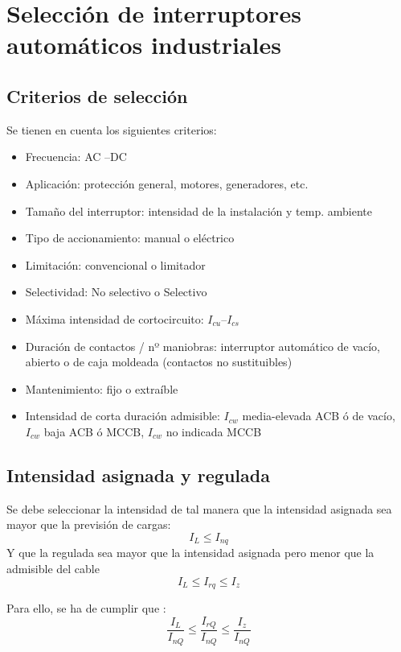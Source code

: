 \section{Selección de interruptores automáticos industriales}
\subsection{Criterios de selección}
Se tienen en cuenta los siguientes criterios:
\begin{itemize}
	\item Frecuencia: AC –DC
	\item Aplicación: protección general, motores, generadores, etc.
	\item Tamaño del interruptor: intensidad de la instalación y temp. ambiente
	\item Tipo de accionamiento: manual o eléctrico
	\item Limitación: convencional o limitador
	\item Selectividad: No selectivo o Selectivo
	\item Máxima intensidad de cortocircuito: $I_{cu}–I_{cs}$
	\item Duración de contactos / nº maniobras: interruptor automático de vacío, abierto o de caja moldeada (contactos no sustituibles)
	\item Mantenimiento: fijo o extraíble
	\item Intensidad de corta duración admisible: $I_{cw}$ media-elevada ACB ó de vacío, $I_{cw}$ baja ACB ó MCCB, $I_{cw}$ no indicada MCCB
\end{itemize}
\subsection{Intensidad asignada y regulada}
Se debe seleccionar la intensidad de tal manera que la intensidad asignada sea mayor que la previsión de cargas:
\begin{equation}
	I_L\le I_{nq}
\end{equation}
Y que la regulada sea mayor que la intensidad asignada pero menor que la admisible del cable
\begin{equation}
	I_L \le I_{rq} \le I_z
\end{equation}

Para ello, se ha de cumplir que :
\begin{equation}
	\dfrac{I_L}{I_{nQ}}\le \dfrac{I_{rQ}}{I_{nQ}}  \le \dfrac{I_z}{I_{nQ}}
\end{equation}

